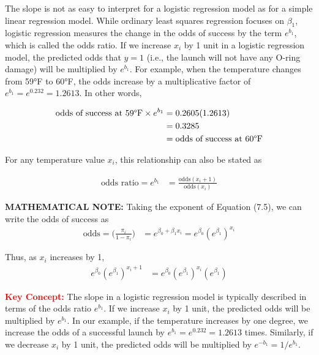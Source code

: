 \documentclass[
]{report}
\begin{document}
The slope is not as easy to interpret for a logistic regression model as for a simple linear regression model. While ordinary least squares regression focuses on \(\beta_1\), logistic regression measures the change in the odds of success by the term \(e^{b_1}\), which is called the odds ratio. If we increase \(x_i\) by 1 unit in a logistic regression model, the predicted odds that \(y = 1\) (i.e., the launch will not have any O-ring damage) will be multiplied by \(e^{b_1}\). For example, when the temperature changes from 59°F to 60°F, the odds increase by a multiplicative factor of \(e^{b_1} = e^{0.232} = 1.2613\). In other words,

\begin{align}
\text{odds of success at 59°F} \times e^{b_1} 
&= 0.2605(1.2613) \notag \\
&= 0.3285 \notag \\
&= \text{odds of success at 60°F} \notag
\end{align}

For any temperature value \(x_i\), this relationship can also be stated as

\begin{align}
\text{odds ratio} = e^{b_1} &= \frac{\text{odds}(x_i + 1)}{\text{odds}(x_i)} \tag{7.10}
\end{align}

\large

\textbf{MATHEMATICAL NOTE:}
Taking the exponent of Equation (7.5), we can write the odds of success as
\begin{align}
\text{odds} = \biggl(\frac{\pi_i}{1 - \pi_i}\biggr) &= e^{\beta_0 + \beta_1 x_i} = e^{\beta_0}(e^{\beta_1})^{x_i} \tag{7.11}
\end{align}

Thus, as \(x_i\) increases by 1,
\begin{align}
e^{\beta_0}(e^{\beta_1})^{x_i + 1} &= e^{\beta_0}(e^{\beta_1})^{x_i}(e^{\beta_1}) \tag{7.12}
\end{align}

\normalsize

\Large

\textbf{\textcolor{red}{Key Concept:}}
\color{red}
The slope in a logistic regression model is typically described in terms of the odds ratio \(e^{b_1}\). If we increase \(x_i\) by 1 unit, the predicted odds will be multiplied by \(e^{b_1}\). In our example, if the temperature increases by one degree, we increase the odds of a successful launch by \(e^{b_1} = e^{0.232} = 1.2613\) times. Similarly, if we decrease \(x_i\) by 1 unit, the predicted odds will be multiplied by \(e^{-b_1} = 1/e^{b_1}\).
\color{black}
\normalsize
\end{document}
